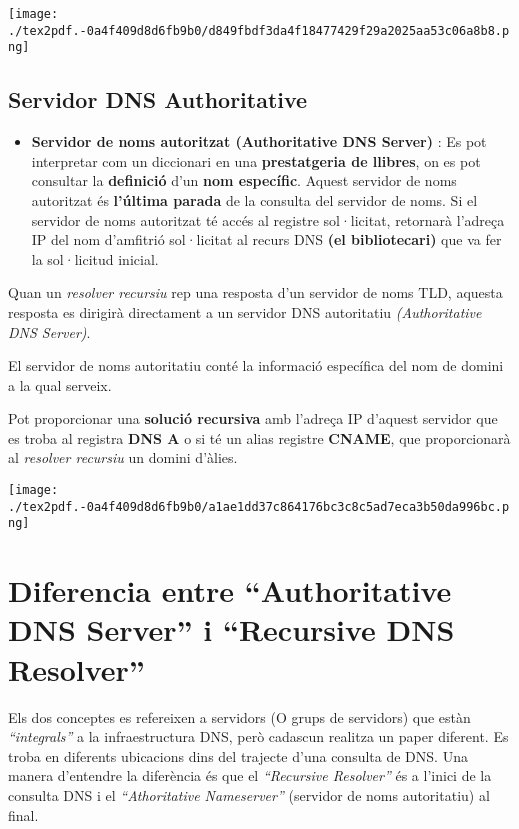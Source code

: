 \documentclass[]{article}
\providecommand{\tightlist}{%
  \setlength{\itemsep}{0pt}\setlength{\parskip}{0pt}}
\begin{document}
\texttt{[image: ./tex2pdf.-0a4f409d8d6fb9b0/d849fbdf3da4f18477429f29a2025aa53c06a8b8.png]}

\hypertarget{servidor-dns-authoritative}{%
\subsection{\texorpdfstring{\textbf{Servidor DNS
Authoritative}}{Servidor DNS Authoritative}}\label{servidor-dns-authoritative}}

\begin{itemize}
\tightlist
\item
  \textbf{Servidor de noms autoritzat (Authoritative DNS Server)} : Es
  pot interpretar com un diccionari en una \textbf{prestatgeria de
  llibres}, on es pot consultar la \textbf{definició} d'un \textbf{nom
  específic}. Aquest servidor de noms autoritzat és \textbf{l'última
  parada} de la consulta del servidor de noms. Si el servidor de noms
  autoritzat té accés al registre sol·licitat, retornarà l'adreça IP del
  nom d'amfitrió sol·licitat al recurs DNS \textbf{(el bibliotecari)}
  que va fer la sol·licitud inicial.
\end{itemize}

Quan un \emph{resolver recursiu} rep una resposta d'un servidor de noms
TLD, aquesta resposta es dirigirà directament a un servidor DNS
autoritatiu \emph{(Authoritative DNS Server)}.

El servidor de noms autoritatiu conté la informació específica del nom
de domini a la qual serveix.

Pot proporcionar una \textbf{solució recursiva} amb l'adreça IP d'aquest
servidor que es troba al registra \textbf{DNS A} o si té un alias
registre \textbf{CNAME}, que proporcionarà al \emph{resolver recursiu}
un domini d'àlies.

\texttt{[image: ./tex2pdf.-0a4f409d8d6fb9b0/a1ae1dd37c864176bc3c8c5ad7eca3b50da996bc.png]}

\hypertarget{diferencia-entre-authoritative-dns-server-i-recursive-dns-resolver}{%
\section{\texorpdfstring{\textbf{Diferencia entre ``Authoritative DNS
Server'' i ``Recursive DNS
Resolver''}}{Diferencia entre ``Authoritative DNS Server'' i ``Recursive DNS Resolver''}}\label{diferencia-entre-authoritative-dns-server-i-recursive-dns-resolver}}

Els dos conceptes es refereixen a servidors (O grups de servidors) que
estàn \emph{``integrals''} a la infraestructura DNS, però cadascun
realitza un paper diferent. Es troba en diferents ubicacions dins del
trajecte d'una consulta de DNS. Una manera d'entendre la diferència és
que el \emph{``Recursive Resolver''} és a l'inici de la consulta DNS i
el \emph{``Athoritative Nameserver''} (servidor de noms autoritatiu) al
final.
\end{document}

